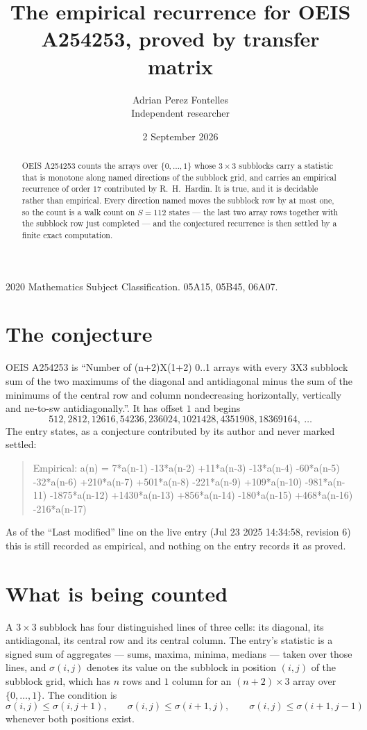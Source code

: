 \documentclass[11pt,a4paper]{article}
\title{The empirical recurrence for OEIS A254253, proved by transfer matrix}
\author{Adrian Perez Fontelles\\ \small Independent researcher}
\date{2 September 2026}
\theoremstyle{plain}
\theoremstyle{definition}
\begin{document}
\maketitle

\begin{abstract}
OEIS A254253 counts the arrays over $\{0,\dots,1\}$ whose $3\times3$ subblocks carry a
statistic that is monotone along named directions of the subblock grid, and carries an
empirical recurrence of order $17$ contributed by R.~H.~Hardin. It is true, and it is
decidable rather than empirical. Every direction named moves the subblock row by at most one,
so the count is a walk count on $S=112$ states --- the last two array rows together with the
subblock row just completed --- and the conjectured recurrence is then settled by a finite
exact computation.
\end{abstract}

\noindent\small 2020 Mathematics Subject Classification. 05A15, 05B45, 06A07.\normalsize

\section{The conjecture}

OEIS A254253 is ``Number of (n+2)X(1+2) 0..1 arrays with every 3X3 subblock sum of the two maximums of the diagonal and antidiagonal minus the sum of the minimums of the central row and column nondecreasing horizontally, vertically and ne-to-sw antidiagonally.''. It has offset $1$ and begins
\[
512, 2812, 12616, 54236, 236024, 1021428, 4351908, 18369164,\ \dots
\]
The entry states, as a conjecture contributed by its author and never marked settled:
\begin{quote}
Empirical: a(n) = 7*a(n-1) -13*a(n-2) +11*a(n-3) -13*a(n-4) -60*a(n-5) -32*a(n-6) +210*a(n-7) +501*a(n-8) -221*a(n-9) +109*a(n-10) -981*a(n-11) -1875*a(n-12) +1430*a(n-13) +856*a(n-14) -180*a(n-15) +468*a(n-16) -216*a(n-17)
\end{quote}
As of the ``Last modified'' line on the live entry (Jul 23 2025 14:34:58, revision 6) this is still
recorded as empirical, and nothing on the entry records it as proved.

\section{What is being counted}

A $3\times3$ subblock has four distinguished lines of three cells: its diagonal, its
antidiagonal, its central row and its central column. The entry's statistic is a signed sum of
aggregates --- sums, maxima, minima, medians --- taken over those lines, and $\sigma(i,j)$
denotes its value on the subblock in position $(i,j)$ of the subblock grid, which has $n$ rows
and $1$ column for an $(n+2)\times3$ array over $\{0,\dots,1\}$. The condition is
\[
\sigma(i,j)\le\sigma(i,j+1),\qquad \sigma(i,j)\le\sigma(i+1,j),\qquad \sigma(i,j)\le\sigma(i+1,j-1)
\]
whenever both positions exist.
\end{document}
